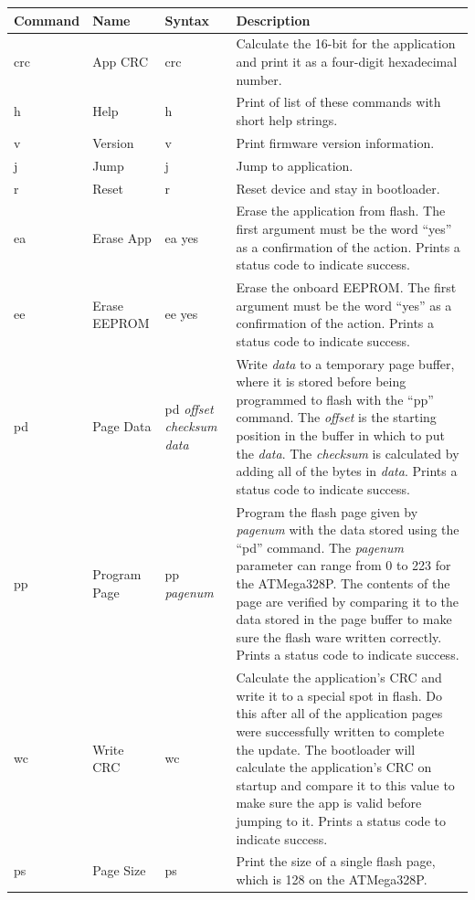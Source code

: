 \documentclass{article}
\begin{document}
\begin{longtable}{l|l|p{}|p{}}
    \centering
    Command & Name & Syntax & Description \\
    \hline
    \endhead
    crc & App CRC & crc & Calculate the 16-bit for the application and print it as a four-digit
    hexadecimal number. \\
    h & Help & h & Print of list of these commands with short help strings. \\
    v & Version & v & Print firmware version information. \\
    j & Jump & j & Jump to application. \\
    r & Reset & r & Reset device and stay in bootloader. \\
    ea & Erase App & ea yes & Erase the application from flash.  The first argument must be the
    word ``yes'' as a confirmation of the action. Prints a status code to indicate success. \\
    ee & Erase EEPROM & ee yes & Erase the onboard EEPROM.  The first argument must be the word
    ``yes'' as a confirmation of the action. Prints a status code to indicate success. \\
    pd & Page Data & pd \emph{offset checksum data} & Write \emph{data} to a temporary page 
    buffer, where it is stored before being programmed to flash with the ``pp'' command.  The
    \emph{offset} is the starting position in the buffer in which to put the \emph{data}.  The
    \emph{checksum} is calculated by adding all of the bytes in \emph{data}.  Prints a status
    code to indicate success. \\
    pp & Program Page & pp \emph{pagenum} & Program the flash page given by \emph{pagenum}
    with the data stored using the ``pd'' command.  The \emph{pagenum} parameter can range from
    0 to 223 for the ATMega328P.  The contents of the page are verified by comparing it to the
    data stored in the page buffer to make sure the flash ware written correctly.  Prints a
    status code to indicate success. \\
    wc & Write CRC & wc & Calculate the application's CRC and write it to a special spot in 
    flash.  Do this after all of the application pages were successfully written to complete the
    update.  The bootloader will calculate the application's CRC on startup and compare it to
    this value to make sure the app is valid before jumping to it.  Prints a status code to
    indicate success.  \\
    ps & Page Size & ps & Print the size of a single flash page, which is 128 on the ATMega328P.

\end{longtable}
\end{document}

